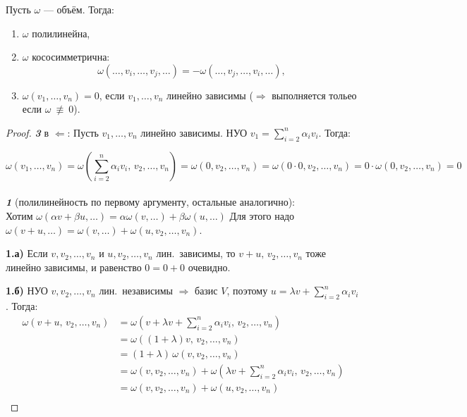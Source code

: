 \begin{stmt}
    Пусть $\omega$ --- объём. Тогда:
    \begin{enumerate}[label=\textbf{\arabic*.}]
        \item $\omega$ полилинейна,
        \item $\omega$ кососимметрична:
        \[
            \omega(\dots, v_i, \dots, v_j, \dots) = -\omega(\dots, v_j, \dots, v_i, \dots),
        \]
        \item $\omega(v_1, \dots, v_n) = 0$, если $v_1, \dots, v_n$ линейно зависимы (\textcircled{$\Rightarrow$}
        выполняется тольео если $\omega \ \not\equiv \ 0$).
    \end{enumerate}

    \begin{proof}
        \textbf{\emph{3}} в \textcircled{$\Leftarrow$}: Пусть $v_1, \dots, v_n$ линейно зависимы. НУО
        $v_1 = \sum_{i=2}^{n} \alpha_i v_i$. Тогда:

        \[
            \omega(v_1, \dots, v_n)
            = \omega\!\left(\sum_{i=2}^{n} \alpha_i v_i,\, v_2, \dots, v_n\right)
            = \omega(0, v_2, \dots, v_n)
            = \omega(0 \cdot 0, v_2, \dots, v_n)
            = 0 \cdot \omega(0, v_2, \dots, v_n) = 0
        \]
        \\

        \textbf{\emph{1}} (полилинейность по первому аргументу, остальные аналогично): \\
        Хотим $\omega(\alpha v + \beta u, \dots) = \alpha \omega(v, \dots) + \beta \omega(u, \dots)$
        Для этого надо $\omega(v + u, \dots) = \omega(v, \dots) + \omega(u, v_2, \dots, v_n)$.

        \textbf{1.а)} Если $v, v_2, \dots, v_n$ и $u, v_2, \dots, v_n$ лин.\ зависимы,
        то $v + u,\, v_2, \dots, v_n$ тоже линейно зависимы, и равенство $0 = 0 + 0$ очевидно.

        \textbf{1.б)} НУО $v, v_2, \dots, v_n$ лин.\ независимы $\Rightarrow$ базис $V$,
        поэтому $u = \lambda v + \sum_{i=2}^{n} \alpha_i v_i$. Тогда:
        \begin{align*}
            \omega\!\left(v + u,\, v_2, \dots, v_n\right)
            &= \omega\!\left(v + \lambda v + \sum_{i=2}^{n}\alpha_i v_i,\, v_2, \dots, v_n\right) \\
            &= \omega\!\left((1+\lambda)v,\, v_2, \dots, v_n\right) \\
            &= (1+\lambda)\,\omega(v, v_2, \dots, v_n) \\
            &= \omega(v, v_2, \dots, v_n) + \omega\!\left(\lambda v + \sum_{i=2}^{n}\alpha_i v_i,\, v_2,
            \dots, v_n\right) \\
            &= \omega(v, v_2, \dots, v_n) + \omega(u, v_2, \dots, v_n) \\
        \end{align*}


\end{proof}
\end{stmt}
